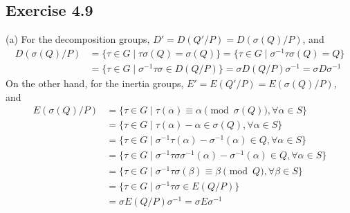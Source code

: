 \documentclass[../Marcus.tex]{subfiles}
\begin{document}

\subsection*{Exercise 4.9}

(a) For the decomposition groups, $D' = D(Q'/P) = D(\sigma(Q)/P)$, and
\begin{align*}
    D(\sigma(Q)/P) & = \{\tau\in G\mid \tau\sigma(Q)=\sigma(Q)\} = \{\tau\in G\mid \sigma^{-1}\tau\sigma(Q)=Q\} \\
    &= \{\tau\in G\mid \sigma^{-1}\tau\sigma \in D(Q/P)\} = \sigma D(Q/P) \sigma^{-1} = \sigma D\sigma^{-1}
\end{align*}
On the other hand, for the inertia groups, $E' = E(Q'/P) = E(\sigma(Q)/P)$, and
\begin{align*}
    E(\sigma(Q)/P) &= \{\tau\in G\mid \tau(\alpha)\equiv\alpha \pmod{\sigma(Q)}, \forall\alpha\in S\} \\
    &= \{\tau\in G\mid \tau(\alpha)-\alpha\in\sigma(Q), \forall\alpha\in S\} \\
    &= \{\tau\in G\mid \sigma^{-1}\tau(\alpha)-\sigma^{-1}(\alpha)\in Q, \forall\alpha\in S\} \\
    &= \{\tau\in G\mid \sigma^{-1}\tau\sigma\sigma^{-1}(\alpha)-\sigma^{-1}(\alpha)\in Q, \forall\alpha\in S\} \\
    &= \{\tau\in G\mid \sigma^{-1}\tau\sigma(\beta) \equiv \beta \pmod{Q}, \forall\beta\in S\} \\
    &= \{\tau\in G\mid \sigma^{-1}\tau\sigma\in E(Q/P)\} \\
    &= \sigma E(Q/P)\sigma^{-1} = \sigma E\sigma^{-1}
\end{align*}
\end{document}
